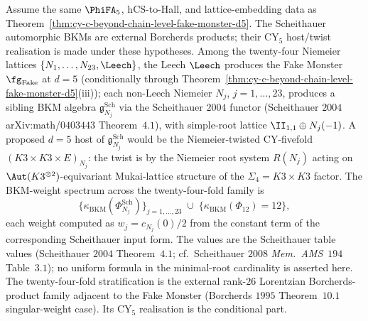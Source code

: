 \begin{corollary}[Twenty-three-Niemeier external sibling family at the $d = 5$ frontier]
\label{cor:cy-c-beyond-niemeier-stratification-d5}
Assume the same $\PhiFA_5$, hCS-to-Hall, and lattice-embedding data as
Theorem~\ref{thm:cy-c-beyond-chain-level-fake-monster-d5}. The
Scheithauer automorphic BKMs are external Borcherds products; their
CY$_5$ host/twist realisation is made under these hypotheses.
Among the twenty-four Niemeier lattices
$\{N_1, \ldots, N_{23}, \Leech\}$, the Leech $\Leech$ produces the
Fake Monster $\fg_{\mathrm{Fake}}$ at $d = 5$
(conditionally through Theorem~\ref{thm:cy-c-beyond-chain-level-fake-monster-d5}\textup{(iii)});
each non-Leech Niemeier $N_j$, $j = 1, \ldots, 23$, produces a
sibling BKM algebra
$\mathfrak g^{\mathrm{Sch}}_{N_j}$ via the Scheithauer $2004$
functor (Scheithauer $2004$ arXiv:math/$0403443$ Theorem~$4.1$),
with simple-root lattice $\II_{1, 1} \oplus N_j(-1)$. A proposed $d = 5$
host of $\mathfrak g^{\mathrm{Sch}}_{N_j}$ would be the Niemeier-twisted
CY-fivefold $(K3 \times K3 \times E)_{N_j}$: the twist is by the
Niemeier root system $R(N_j)$ acting on
$\Aut(K3^{\otimes 2})$-equivariant Mukai-lattice structure of the
$\Sigma_4 = K3 \times K3$ factor. The BKM-weight spectrum across
the twenty-four-fold family is
\[
 \bigl\{ \kappa_{\mathrm{BKM}}(\Phi_{N_j}^{\mathrm{Sch}})
 \bigr\}_{j = 1, \ldots, 23}
 \;\cup\;
 \bigl\{ \kappa_{\mathrm{BKM}}(\Phi_{12}) = 12 \bigr\},
\]
each weight computed as $w_j = c_{N_j}(0)/2$ from the constant term of
the corresponding Scheithauer input form. The values are the
Scheithauer table values (Scheithauer $2004$ Theorem~$4.1$; cf.\
Scheithauer $2008$ \emph{Mem.\ AMS}~$194$ Table~$3.1$); no uniform
formula in the minimal-root cardinality is asserted here. The
twenty-four-fold stratification is the external rank-$26$ Lorentzian
Borcherds-product family adjacent to the Fake Monster
(Borcherds $1995$ Theorem~$10.1$ singular-weight case). Its CY$_5$
realisation is the conditional part.
\end{corollary}

